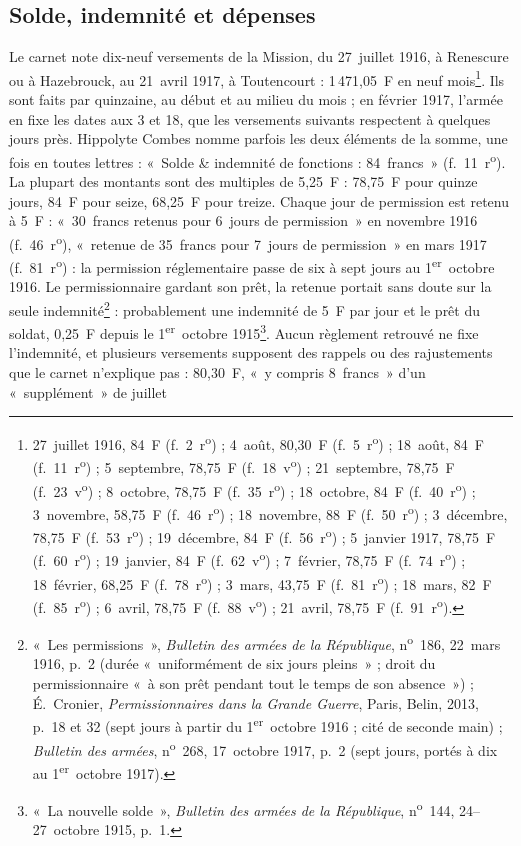 \subsection{Solde, indemnité et dépenses}

Le carnet note dix-neuf versements de la Mission, du 27~juillet 1916, à Renescure ou à Hazebrouck, au 21~avril 1917, à Toutencourt : 1\,471,05~F en neuf mois\footnote{27~juillet 1916, 84~F (f.~2~r\textsuperscript{o}) ; 4~août, 80,30~F (f.~5~r\textsuperscript{o}) ; 18~août, 84~F (f.~11~r\textsuperscript{o}) ; 5~septembre, 78,75~F (f.~18~v\textsuperscript{o}) ; 21~septembre, 78,75~F (f.~23~v\textsuperscript{o}) ; 8~octobre, 78,75~F (f.~35~r\textsuperscript{o}) ; 18~octobre, 84~F (f.~40~r\textsuperscript{o}) ; 3~novembre, 58,75~F (f.~46~r\textsuperscript{o}) ; 18~novembre, 88~F (f.~50~r\textsuperscript{o}) ; 3~décembre, 78,75~F (f.~53~r\textsuperscript{o}) ; 19~décembre, 84~F (f.~56~r\textsuperscript{o}) ; 5~janvier 1917, 78,75~F (f.~60~r\textsuperscript{o}) ; 19~janvier, 84~F (f.~62~v\textsuperscript{o}) ; 7~février, 78,75~F (f.~74~r\textsuperscript{o}) ; 18~février, 68,25~F (f.~78~r\textsuperscript{o}) ; 3~mars, 43,75~F (f.~81~r\textsuperscript{o}) ; 18~mars, 82~F (f.~85~r\textsuperscript{o}) ; 6~avril, 78,75~F (f.~88~v\textsuperscript{o}) ; 21~avril, 78,75~F (f.~91~r\textsuperscript{o}).}. Ils sont faits par quinzaine, au début et au milieu du mois ; en février 1917, l'armée en fixe les dates aux 3 et 18, que les versements suivants respectent à quelques jours près. Hippolyte Combes nomme parfois les deux éléments de la somme, une fois en toutes lettres : «~Solde \& indemnité de fonctions : 84~francs~» (f.~11~r\textsuperscript{o}). La plupart des montants sont des multiples de 5,25~F : 78,75~F pour quinze jours, 84~F pour seize, 68,25~F pour treize. Chaque jour de permission est retenu à 5~F : «~30~francs retenus pour 6~jours de permission~» en novembre 1916 (f.~46~r\textsuperscript{o}), «~retenue de 35~francs pour 7~jours de permission~» en mars 1917 (f.~81~r\textsuperscript{o}) : la permission réglementaire passe de six à sept jours au 1\textsuperscript{er}~octobre 1916. Le permissionnaire gardant son prêt, la retenue portait sans doute sur la seule indemnité\footnote{«~Les permissions~», \textit{Bulletin des armées de la République}, n\textsuperscript{o}~186, 22~mars 1916, p.~2 (durée «~uniformément de six jours pleins~» ; droit du permissionnaire «~à son prêt pendant tout le temps de son absence~») ; É.~Cronier, \textit{Permissionnaires dans la Grande Guerre}, Paris, Belin, 2013, p.~18 et 32 (sept jours à partir du 1\textsuperscript{er}~octobre 1916 ; cité de seconde main) ; \textit{Bulletin des armées}, n\textsuperscript{o}~268, 17~octobre 1917, p.~2 (sept jours, portés à dix au 1\textsuperscript{er}~octobre 1917).} : probablement une indemnité de 5~F par jour et le prêt du soldat, 0,25~F depuis le 1\textsuperscript{er}~octobre 1915\footnote{«~La nouvelle solde~», \textit{Bulletin des armées de la République}, n\textsuperscript{o}~144, 24--27~octobre 1915, p.~1.}. Aucun règlement retrouvé ne fixe l'indemnité, et plusieurs versements supposent des rappels ou des rajustements que le carnet n'explique pas : 80,30~F, «~y compris 8~francs~» d'un «~supplément~» de juillet 